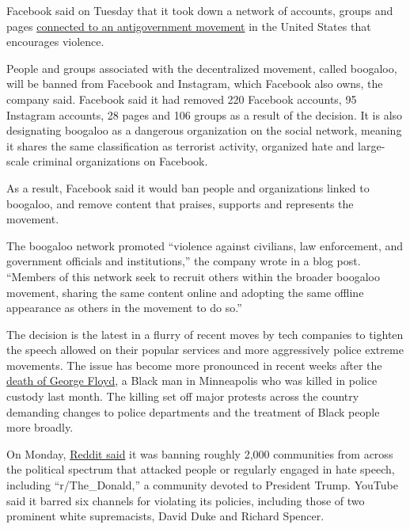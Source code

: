 Facebook said on Tuesday that it took down a network of accounts, groups
and pages
\href{https://about.fb.com/news/2020/06/banning-a-violent-network-in-the-us/}{connected
to an antigovernment movement} in the United States that encourages
violence.

People and groups associated with the decentralized movement, called
boogaloo, will be banned from Facebook and Instagram, which Facebook
also owns, the company said. Facebook said it had removed 220 Facebook
accounts, 95 Instagram accounts, 28 pages and 106 groups as a result of
the decision. It is also designating boogaloo as a dangerous
organization on the social network, meaning it shares the same
classification as terrorist activity, organized hate and large-scale
criminal organizations on Facebook.

As a result, Facebook said it would ban people and organizations linked
to boogaloo, and remove content that praises, supports and represents
the movement.

The boogaloo network promoted ``violence against civilians, law
enforcement, and government officials and institutions,'' the company
wrote in a blog post. ``Members of this network seek to recruit others
within the broader boogaloo movement, sharing the same content online
and adopting the same offline appearance as others in the movement to do
so.''

The decision is the latest in a flurry of recent moves by tech companies
to tighten the speech allowed on their popular services and more
aggressively police extreme movements. The issue has become more
pronounced in recent weeks after the
\href{https://www.nytimes.com/2020/05/31/us/george-floyd-investigation.html}{death
of George Floyd}, a Black man in Minneapolis who was killed in police
custody last month. The killing set off major protests across the
country demanding changes to police departments and the treatment of
Black people more broadly.

On Monday,
\href{https://www.nytimes.com/2020/06/29/technology/reddit-hate-speech.html}{Reddit
said} it was banning roughly 2,000 communities from across the political
spectrum that attacked people or regularly engaged in hate speech,
including ``r/The\_Donald,'' a community devoted to President Trump.
YouTube said it barred six channels for violating its policies,
including those of two prominent white supremacists, David Duke and
Richard Spencer.

